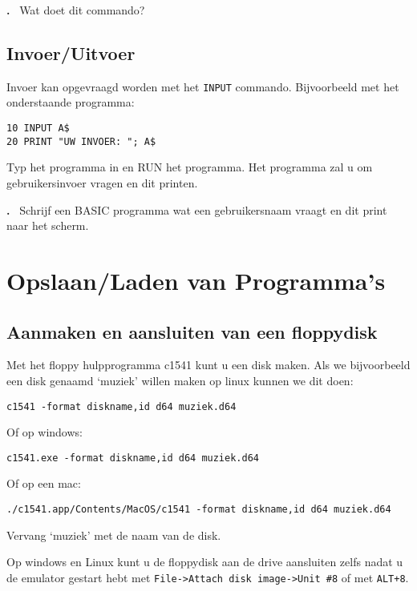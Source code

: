 \documentclass{article}
\newcounter{problem}
\newcounter{solution}
\newcommand\problem{%
  \stepcounter{problem}%
  \textbf{\theproblem.}~%
  \setcounter{solution}{0}%
}
\begin{document}
\problem Wat doet dit commando?

\subsection{Invoer/Uitvoer}

Invoer kan opgevraagd worden met het \verb:INPUT: commando.
Bijvoorbeeld met het onderstaande programma:

\begin{lstlisting}
10 INPUT A$
20 PRINT "UW INVOER: "; A$
\end{lstlisting}

Typ het programma in en RUN het programma.
Het programma zal u om gebruikersinvoer vragen en dit printen.

\problem Schrijf een BASIC programma wat een gebruikersnaam vraagt en dit print naar het scherm.

\section{Opslaan/Laden van Programma's}

\subsection{Aanmaken en aansluiten van een floppydisk}

Met het floppy hulpprogramma c1541 kunt u een disk maken.
Als we bijvoorbeeld een disk genaamd `muziek' willen maken op linux kunnen we dit doen:

\begin{lstlisting}
c1541 -format diskname,id d64 muziek.d64
\end{lstlisting}

Of op windows:

\begin{lstlisting}
c1541.exe -format diskname,id d64 muziek.d64
\end{lstlisting}

Of op een mac:

\begin{lstlisting}
./c1541.app/Contents/MacOS/c1541 -format diskname,id d64 muziek.d64
\end{lstlisting}

Vervang `muziek' met de naam van de disk.

Op windows en Linux kunt u de floppydisk aan de drive aansluiten zelfs nadat u de emulator gestart hebt met \verb:File->Attach disk image->Unit #8: of met \verb:ALT+8:.
\end{document}
